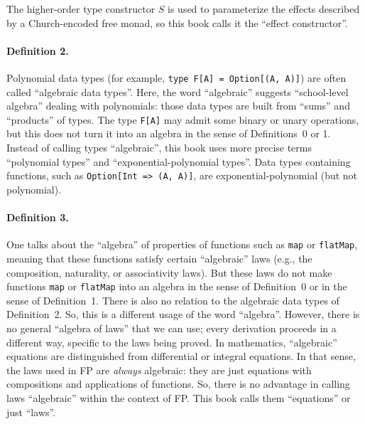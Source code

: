 The higher-order type constructor $S$ is used to parameterize the
effects described by a Church-encoded free monad, so this book calls
it the \textsf{``}effect constructor\textsf{''}.

\paragraph{Definition 2.}

Polynomial data types (for example, \lstinline!type F[A] = Option[(A, A)]!)
are often called \textquotedblleft algebraic data types\textquotedblright .
Here, the word \textsf{``}algebraic\textsf{''} suggests \textsf{``}school-level algebra\textsf{''}
dealing with polynomials: those data types are built from \textsf{``}sums\textsf{''}
and \textsf{``}products\textsf{''} of types. The type \lstinline!F[A]! may admit
some binary or unary operations, but this does not turn it into an
algebra in the sense of Definitions~0 or 1. Instead of calling types
\textsf{``}algebraic\textsf{''}, this book uses more precise terms \textquotedblleft polynomial
types\textquotedblright{} and \textquotedblleft exponential-polynomial
types\textquotedblright . Data types containing functions, such as
\lstinline!Option[Int => (A, A)]!, are exponential-polynomial (but
not polynomial).

\paragraph{Definition 3.}

One talks about the \textquotedblleft algebra\textquotedblright{}
of properties of functions such as \lstinline!map! or \lstinline!flatMap!,
meaning that these functions satisfy certain \textsf{``}algebraic\textsf{''} laws
(e.g., the composition, naturality, or associativity laws). But these
laws do not make functions \lstinline!map! or \lstinline!flatMap!
into an algebra in the sense of Definition~0 or in the sense of Definition~1.
There is also no relation to the algebraic data types of Definition~2.
So, this is a different usage of the word \textsf{``}algebra\textsf{''}. However,
there is no general \textsf{``}algebra of laws\textsf{''} that we can use; every derivation
proceeds in a different way, specific to the laws being proved. In
mathematics, \textsf{``}algebraic\textsf{''} equations are distinguished from differential
or integral equations. In that sense, the laws used in FP are \emph{always}
algebraic: they are just equations with compositions and applications
of functions. So, there is no advantage in calling laws \textsf{``}algebraic\textsf{''}
within the context of FP. This book calls them \textsf{``}equations\textsf{''} or
just \textsf{``}laws\textsf{''}.

